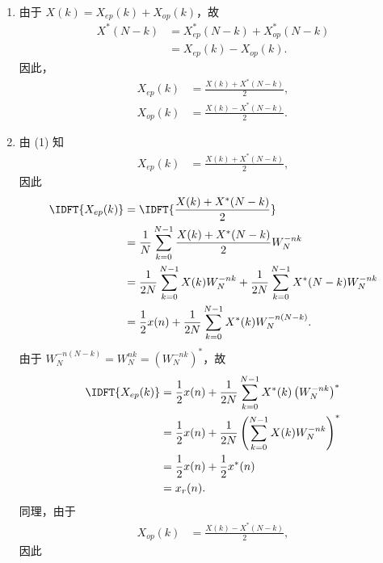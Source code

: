 \begin{solution}
    \begin{enumerate}[label=(\arabic*)]
        \item 由于 $X(k) = X_{ep}(k) + X_{op}(k)$，故
            \begin{align*}
                X^*(N - k) & = X_{ep}^*(N - k) + X_{op}^*(N - k) \\
                & = X_{ep}(k) - X_{op}(k).
            \end{align*}
            因此，
            \begin{align*}
                X_{ep}(k) & = \frac{X(k) + X^*(N - k)}{2}, \\
                X_{op}(k) & = \frac{X(k) - X^*(N - k)}{2}.
            \end{align*}
        \item 由 (1) 知
            \begin{align*}
                X_{ep}(k) & = \frac{X(k) + X^*(N - k)}{2},
            \end{align*}
            因此
            \begin{align*}
                \IDFT{X_{ep}(k)} & = \IDFT{\frac{X(k) + X^*(N - k)}{2}} \\
                & = \frac{1}{N}\sum_{k = 0}^{N - 1}\frac{X(k) + X^*(N - k)}{2}W_N^{-nk} \\
                & = \frac{1}{2N}\sum_{k = 0}^{N - 1}X(k)W_N^{-nk} + \frac{1}{2N}\sum_{k = 0}^{N - 1}X^*(N - k)W_N^{-nk} \\
                & = \frac{1}{2}x(n) + \frac{1}{2N}\sum_{k = 0}^{N - 1}X^*(k)W_N^{-n(N - k)}.
            \end{align*}
            由于 $W_N^{-n(N - k)} = W_N^{nk} = \left(W_N^{-nk}\right)^*$，故
            \begin{align*}
                \IDFT{X_{ep}(k)} & = \frac{1}{2}x(n) + \frac{1}{2N}\sum_{k = 0}^{N - 1}X^*(k)\left(W_N^{-nk}\right)^* \\
                & = \frac{1}{2}x(n) + \frac{1}{2N}\left(\sum_{k = 0}^{N - 1}X(k)W_N^{-nk}\right)^* \\
                & = \frac{1}{2}x(n) + \frac{1}{2}x^*(n) \\
                & = x_r(n).
            \end{align*}
            同理，由于
            \begin{align*}
                X_{op}(k) & = \frac{X(k) - X^*(N - k)}{2},
            \end{align*}
            因此

\end{enumerate}
\end{solution}
